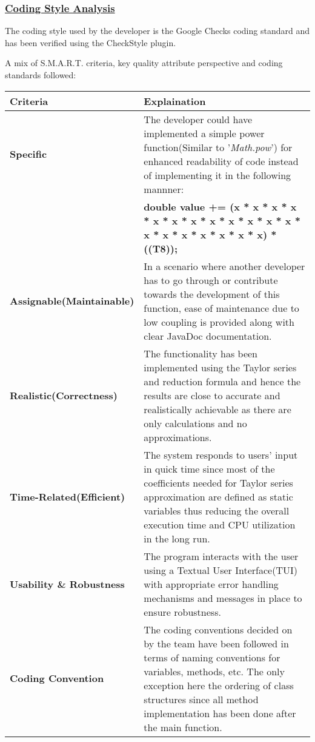 \documentclass[12pt]{report}
\begin{document}
	\subsubsection{\underline{Coding Style Analysis}}The coding style used by the developer is the Google Checks coding standard and has been verified using the CheckStyle plugin.\par
	A mix of S.M.A.R.T. criteria, key quality attribute perspective and coding standards followed:
	\begin{center}
	\begin{tabular}{|p{5.2cm}|p{10cm}|}
	\hline
	Criteria&Explaination\\
	\hline
	\vspace{0.1cm}\textbf{Specific}&\vspace{0.1cm}The developer could have implemented a simple power function(Similar to '\textit{Math.pow}') for enhanced readability of code instead of implementing it in the following mannner:\\&\small\textbf{double value += (x * x * x * x * x * x * x * x * x * x * x * x * x * x * x * x * x * x * x) * ((T8));}\\
	\vspace{0.12cm}\textbf{Assignable(Maintainable)}&\vspace{0.1cm}In a scenario where another developer has to go through or contribute towards the development of this function, ease of maintenance due to low coupling is provided along with clear JavaDoc documentation.\\
	\vspace{0.12cm}\textbf{Realistic(Correctness)}&\vspace{0.1cm}The functionality has been implemented using the Taylor series and reduction formula and hence the results are close to accurate and realistically achievable as there are only calculations and no approximations.\\
	\vspace{0.05cm}\textbf{Time-Related(Efficient)}&\vspace{0.05cm}The system responds to users' input in quick time since most of the coefficients needed for Taylor series approximation are defined as static variables thus reducing the overall execution time and CPU utilization in the long run.\\
	\vspace{0.05cm}\textbf{Usability \& Robustness}&\vspace{0.05cm} The program interacts with the user using a Textual User Interface(TUI) with appropriate error handling mechanisms and messages in place to ensure robustness.\\ 
	\vspace{0.05cm}\textbf{Coding Convention}&\vspace{0.05cm}The coding conventions decided on by the team have been followed in terms of naming conventions for variables, methods, etc. The only exception here the ordering of class structures since all method implementation has been done after the main function. \\
	\hline
	\end{tabular}
	\end{center}
\end{document}
